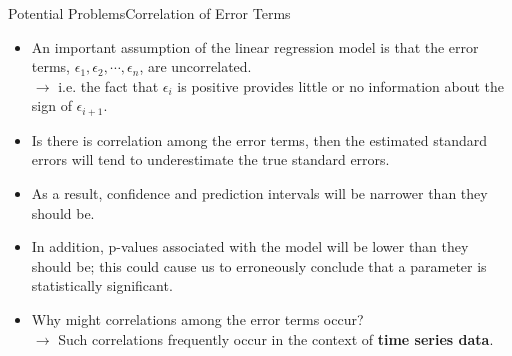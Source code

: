 \begin{frame}{Potential Problems}{Correlation of Error Terms}

\begin{itemize}
    \item An important assumption of the linear regression model is that the error terms, $\epsilon_1, \epsilon_2, \cdots, \epsilon_n$, are uncorrelated. \pause \\
    $\rightarrow$ i.e. the fact that $\epsilon_i$ is positive provides little or no information about the sign of $\epsilon_{i+1}$. \pause

    \item Is there is correlation among the error terms, then the estimated standard errors will tend to underestimate the true standard errors. \pause
    
    \item As a result, confidence and prediction intervals will be narrower than they should be. \pause

    \item In addition, p-values associated with the model will be lower than they should be; this could cause us to erroneously conclude that a parameter is statistically significant. \pause

    \item Why might correlations among the error terms occur? \pause \\ $\rightarrow$ Such correlations frequently occur in the context of \textbf{time series data}.
    
\end{itemize}


\end{frame}

